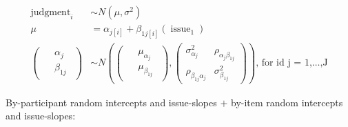 \documentclass{article}
\begin{document}
$$
\begin{aligned}
  \operatorname{judgment}_{i}  &\sim N \left(\mu, \sigma^2 \right) \\
    \mu &=\alpha_{j[i]} + \beta_{1j[i]}(\operatorname{issue}_{\operatorname{1}}) \\    
\left(
  \begin{array}{c} 
    \begin{aligned}
      &\alpha_{j} \\
      &\beta_{1j}
    \end{aligned}
  \end{array}
\right)
  &\sim N \left(
\left(
  \begin{array}{c} 
    \begin{aligned}
      &\mu_{\alpha_{j}} \\
      &\mu_{\beta_{1j}}
    \end{aligned}
  \end{array}
\right)
, 
\left(
  \begin{array}{cc}
     \sigma^2_{\alpha_{j}} & \rho_{\alpha_{j}\beta_{1j}} \\ 
     \rho_{\beta_{1j}\alpha_{j}} & \sigma^2_{\beta_{1j}}
  \end{array}
\right)
 \right)
    \text{, for id j = 1,} \dots \text{,J}
\end{aligned}
$$

By-participant random intercepts and issue-slopes $+$ by-item random intercepts and issue-slopes:
\end{document}
